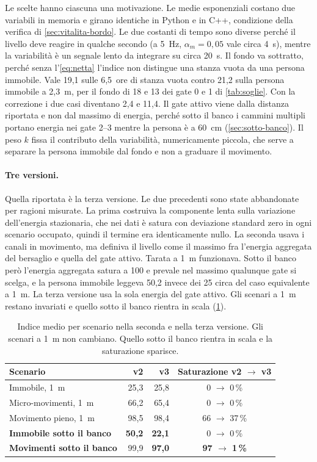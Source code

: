 Le scelte hanno ciascuna una motivazione. Le medie esponenziali costano due variabili
in memoria e girano identiche in Python e in C++, condizione della verifica di
\cref{sec:vitalita-bordo}. Le due costanti di tempo sono diverse perché il livello
deve reagire in qualche secondo (a 5~Hz, $\alpha_m = 0{,}05$ vale circa 4~s), mentre
la variabilità è un segnale lento da integrare su circa 20~s. Il fondo va sottratto,
perché senza l'\cref{eq:netta} l'indice non distingue una stanza vuota da una persona
immobile. Vale 19,1 sulle 6,5~ore di stanza vuota contro 21,2 sulla persona immobile a
2,3~m, per il fondo di 18 e 13 dei gate 0 e 1 di \cref{tab:soglie}. Con la correzione
i due casi diventano 2,4 e 11,4. Il gate attivo viene dalla distanza riportata e non
dal massimo di energia, perché sotto il banco i cammini multipli portano energia nei
gate 2--3 mentre la persona è a 60~cm (\cref{sec:sotto-banco}). Il peso $k$ fissa il
contributo della variabilità, numericamente piccola, che serve a separare la persona
immobile dal fondo e non a graduare il movimento.

\paragraph{Tre versioni.}
\label{sec:vitalita-evoluzione}
Quella riportata è la terza versione. Le due precedenti sono state abbandonate per
ragioni misurate. La prima costruiva la componente lenta sulla variazione
dell'energia stazionaria, che nei dati è satura con deviazione standard zero in ogni
scenario occupato, quindi il termine era identicamente nullo. La seconda usava i
canali in movimento, ma definiva il livello come il massimo fra l'energia aggregata
del bersaglio e quella del gate attivo. Tarata a 1~m funzionava. Sotto il banco però
l'energia aggregata satura a 100 e prevale nel massimo qualunque gate si scelga, e la
persona immobile leggeva 50,2 invece dei 25 circa del caso equivalente a 1~m. La
terza versione usa la sola energia del gate attivo. Gli scenari a 1~m restano
invariati e quello sotto il banco rientra in scala (\cref{tab:vitalita-v2v3}).

\begin{table}[htbp]
\centering
\caption{Indice medio per scenario nella seconda e nella terza versione. Gli scenari
a 1~m non cambiano. Quello sotto il banco rientra in scala e la saturazione sparisce.}
\label{tab:vitalita-v2v3}
\small
\begin{tabular}{@{}lrrc@{}}
\toprule
Scenario & v2 & v3 & Saturazione v2 $\to$ v3 \\
\midrule
Immobile, 1~m & 25,3 & 25,8 & 0 $\to$ 0\,\% \\
Micro-movimenti, 1~m & 66,2 & 65,4 & 0 $\to$ 0\,\% \\
Movimento pieno, 1~m & 98,5 & 98,4 & 66 $\to$ 37\,\% \\
\textbf{Immobile sotto il banco} & \textbf{50,2} & \textbf{22,1} & 0 $\to$ 0\,\% \\
\textbf{Movimenti sotto il banco} & 99,9 & \textbf{97,0} & \textbf{97 $\to$ 1\,\%} \\
\bottomrule
\end{tabular}
\end{table}

